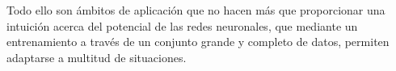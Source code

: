 Todo ello son ámbitos de aplicación que no hacen más que proporcionar una intuición acerca del potencial de las redes neuronales, que mediante un entrenamiento a través de un conjunto grande y completo de datos, permiten adaptarse a multitud de situaciones.\\

